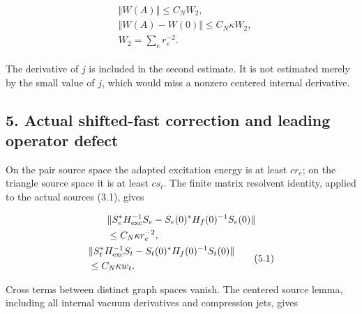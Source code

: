 \begin{gather*}
\begin{aligned}
& \Vert W(A)\Vert  \le  C_{N} W_{2}, \\
& \Vert W(A)-W(0)\Vert  \le  C_{N} \kappa  W_{2}, \\
& W_{2}=\sum _{e} r_{e}^{-2}.
\end{aligned}\tag{4.2}
\end{gather*}

The derivative of \(j\) is included in the second estimate. It is not
estimated merely by the small value of \(j\), which would miss a nonzero
centered internal derivative.

\subsection{5. Actual shifted-fast correction and leading operator
defect}\label{d-actual-shifted-fast-correction-and-leading-operator-defect}

On the pair source space the adapted excitation energy is at least
\(c r_{e}\); on the triangle source space it is at least \(c s_{t}\).
The finite matrix resolvent identity, applied to the actual sources
(3.1), gives

\begin{gather*}
\begin{aligned}
& \Vert S_{e}^{*}H_{\mathrm{exc}}^{-1} S_{e}-S_{e}(0)^{*}H_{f}(0)^{-1} S_{e}(0)\Vert \\
& \le  C_{N} \kappa  r_{e}^{-2},
\end{aligned}\notag \\
\begin{aligned}
& \Vert S_{t}^{*}H_{\mathrm{exc}}^{-1} S_{t}-S_{t}(0)^{*}H_{f}(0)^{-1} S_{t}(0)\Vert \\
& \le  C_{N} \kappa  w_{t}.
\end{aligned}\tag{5.1}
\end{gather*}

Cross terms between distinct graph spaces vanish. The centered source
lemma, including all internal vacuum derivatives and compression jets,
gives

